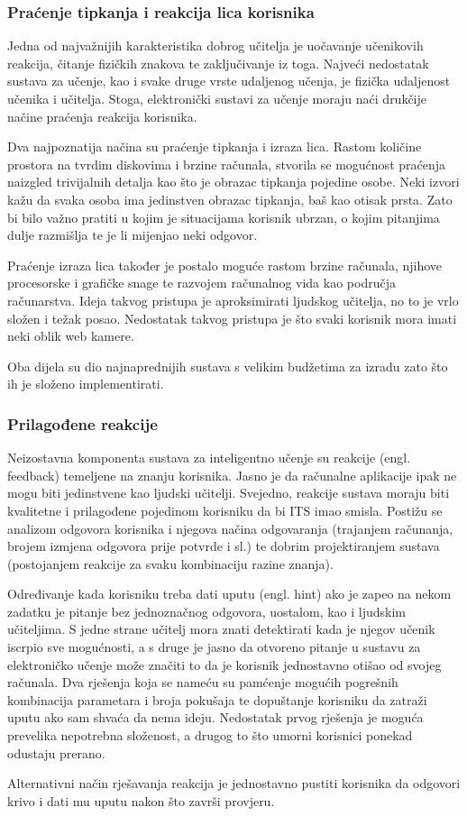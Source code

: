 \documentclass[times, utf8, zavrsni]{fer}
\begin{document}
\subsubsection{Praćenje tipkanja i reakcija lica korisnika}
Jedna od najvažnijih karakteristika dobrog učitelja je uočavanje učenikovih reakcija, čitanje fizičkih znakova te zaključivanje iz toga. Najveći nedostatak sustava za učenje, kao i svake druge vrste udaljenog učenja, je fizička udaljenost učenika i učitelja. Stoga, elektronički sustavi za učenje moraju naći drukčije načine praćenja reakcija korisnika.
\par
Dva najpoznatija načina su praćenje tipkanja i izraza lica. Rastom količine prostora na tvrdim diskovima i brzine računala, stvorila se mogućnost praćenja naizgled trivijalnih detalja kao što je obrazac tipkanja pojedine osobe. Neki izvori kažu da svaka osoba ima jedinstven obrazac tipkanja, baš kao otisak prsta. Zato bi bilo važno pratiti u kojim je situacijama korisnik ubrzan, o kojim pitanjima dulje razmišlja te je li mijenjao neki odgovor.
\par
Praćenje izraza lica također je postalo moguće rastom brzine računala, njihove procesorske i grafičke snage te razvojem računalnog vida kao područja računarstva. Ideja takvog pristupa je aproksimirati ljudskog učitelja, no to je vrlo složen i težak posao. Nedostatak takvog pristupa je što svaki korisnik mora imati neki oblik web kamere.
\par
Oba dijela su dio najnaprednijih sustava s velikim budžetima za izradu zato što ih je složeno implementirati. 

\subsubsection{Prilagođene reakcije}
Neizostavna komponenta sustava za inteligentno učenje su reakcije (engl. feedback) temeljene na znanju korisnika. Jasno je da računalne aplikacije ipak ne mogu biti jedinstvene kao ljudski učitelji. Svejedno, reakcije sustava moraju biti kvalitetne i prilagođene pojedinom korisniku da bi ITS imao smisla. Postižu se analizom odgovora korisnika i njegova načina odgovaranja (trajanjem računanja, brojem izmjena odgovora prije potvrde i sl.) te dobrim projektiranjem sustava (postojanjem reakcije za svaku kombinaciju razine znanja).
\par
Određivanje kada korisniku treba dati uputu (engl. hint) ako je zapeo na nekom zadatku je pitanje bez jednoznačnog odgovora, uostalom, kao i ljudskim učiteljima. S jedne strane učitelj mora znati detektirati kada je njegov učenik iscrpio sve mogućnosti, a s druge je jasno da otvoreno pitanje u sustavu za elektroničko učenje može značiti to da je korisnik jednostavno otišao od svojeg računala. Dva rješenja koja se nameću su pamćenje mogućih pogrešnih kombinacija parametara i broja pokušaja te dopuštanje korisniku da zatraži uputu ako sam shvaća da nema ideju. Nedostatak prvog rješenja je moguća prevelika nepotrebna složenost, a drugog to što umorni korisnici ponekad odustaju prerano.
\par
Alternativni način rješavanja reakcija je jednostavno pustiti korisnika da odgovori krivo i dati mu uputu nakon što završi provjeru.
\end{document}
